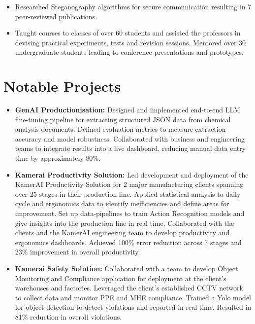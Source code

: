 \documentclass[a4paper,11pt]{article}
\begin{document}
      \begin{itemize}[leftmargin=*, itemsep = -2pt]
        \item {Researched Steganography algorithms for secure communication resulting in 7 peer-reviewed publications.}
        \item {Taught courses to classes of over 60 students and assisted the professors in devising practical experiments, tests and revision sessions. Mentored over 30 undergraduate students leading to conference presentations and prototypes.}
      \end{itemize}

\section{Notable Projects}
  \begin{itemize}[leftmargin=*, itemsep = -2pt]
    \item {\textbf{GenAI Productionisation:}} Designed and implemented end-to-end LLM fine-tuning pipeline for extracting structured JSON data from chemical analysis documents. Defined evaluation metrics to measure extraction accuracy and model robustness. Collaborated with business and engineering teams to integrate results into a live dashboard, reducing manual data entry time by approximately 80\%.
    \item {\textbf{Kamerai Productivity Solution:} Led development and deployment of the KamerAI Productivity Solution for 2 major manufacturing clients spanning over 25 stages in their production line. Applied statistical analysis to daily cycle and ergonomics data to identify inefficiencies and define areas for improvement. Set up data-pipelines to train Action Recognition models and give insights into the production line in real time. Collaborated with the clients and the KamerAI engineering team to develop productivity and ergonomics dashboards. Achieved 100\% error reduction across 7 stages and 23\% improvement in overall productivity.}
    \item {\textbf{Kamerai Safety Solution:} Collaborated with a team to develop Object Monitoring and Compliance application for deployment at the client's warehouses and factories. Leveraged the client's established CCTV network to collect data and monitor PPE and MHE compliance. Trained a Yolo model for object detection to detect violations and reported in real time. Resulted in 81\% reduction in overall violations.}
    
 
  \end{itemize}
\end{document}
